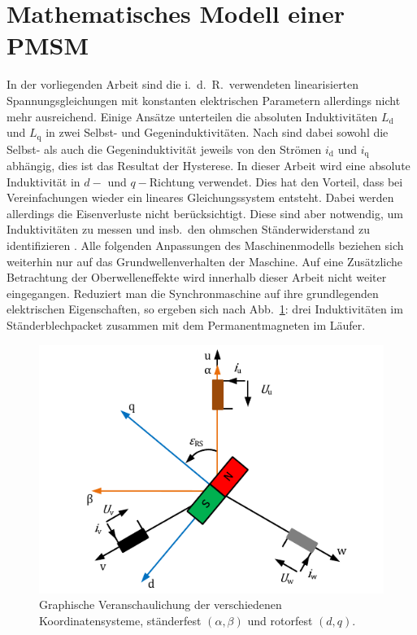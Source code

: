\documentclass[conference,twocolumn]{IEEEtran}
\newcommand{\x}[1]{\mathrm{#1}}
\begin{document}
\section{Mathematisches Modell einer PMSM}\label{sec:math-pmsm}
In der vorliegenden Arbeit sind die i.\ d.\ R.\ verwendeten linearisierten Spannungsgleichungen mit konstanten elektrischen Parametern allerdings nicht mehr ausreichend.
Einige Ansätze unterteilen die absoluten Induktivitäten $L_\x{d}$ und $L_\x{q}$ in zwei Selbst- und Gegeninduktivitäten.
Nach \textcite{stumberger_evaluation_2003} sind dabei sowohl die Selbst- als auch die Gegeninduktivität jeweils von den Strömen $i_\x{d}$ und $i_\x{q}$ abhängig, dies ist das Resultat der Hysterese.
In dieser Arbeit wird eine absolute Induktivität in $d-$ und $q-$Richtung verwendet.
Dies hat den Vorteil, dass bei Vereinfachungen wieder ein lineares Gleichungssystem entsteht.
Dabei werden allerdings die Eisenverluste nicht berücksichtigt.
Diese sind aber notwendig, um Induktivitäten zu messen und insb.\ den ohmschen Ständerwiderstand zu identifizieren \autocite{Kellner2012}.
Alle folgenden Anpassungen des Maschinenmodells beziehen sich weiterhin nur auf das Grundwellenverhalten der Maschine.
Auf eine Zusätzliche Betrachtung der Oberwelleneffekte wird innerhalb dieser Arbeit nicht weiter eingegangen.
Reduziert man die Synchronmaschine auf ihre grundlegenden elektrischen Eigenschaften, so ergeben sich nach Abb.~\ref{fig:synchron-grundlage}: drei Induktivitäten im Ständerblechpacket zusammen mit dem Permanentmagneten im Läufer.

\begin{figure}[h!]
\centering
\includegraphics[width=\columnwidth]{img/synchron-grundlage}
\caption{Graphische Veranschaulichung der verschiedenen Koordinatensysteme, ständerfest $(\alpha, \beta)$ und rotorfest $(d, q)$.}
\label{fig:synchron-grundlage}
\end{figure}
\end{document}
